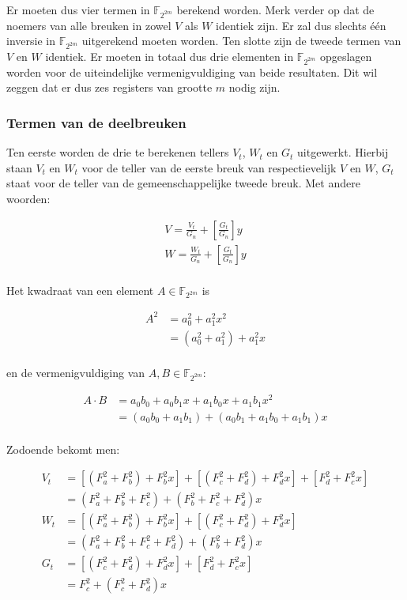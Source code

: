 Er moeten dus vier termen in $\mathbb{F}_{2^{2m}}$ berekend worden. Merk verder op dat de noemers van alle breuken in zowel $V$ als $W$ identiek zijn. Er zal dus slechts \'e\'en inversie in $\mathbb{F}_{2^{2m}}$ uitgerekend moeten worden. Ten slotte zijn de tweede termen van $V$ en $W$ identiek. Er moeten in totaal dus drie elementen in $\mathbb{F}_{2^{2m}}$ opgeslagen worden voor de uiteindelijke vermenigvuldiging van beide resultaten. Dit wil zeggen dat er dus zes registers van grootte $m$ nodig zijn.

\subsubsection{Termen van de deelbreuken}

Ten eerste worden de drie te berekenen tellers $V_t$, $W_t$ en $G_t$ uitgewerkt. Hierbij staan $V_t$ en $W_t$ voor de teller van de eerste breuk van respectievelijk $V$ en $W$, $G_t$ staat voor de teller van de gemeenschappelijke tweede breuk. Met andere woorden:

\[\begin{aligned}
V = \frac{V_t}{G_n} + \left[ \frac{G_t}{G_n} \right] y\\
W = \frac{W_t}{G_n} + \left[ \frac{G_t}{G_n} \right] y\\
\end{aligned}\]

Het kwadraat van een element $A \in \mathbb{F}_{2^{2m}}$ is

\[\begin{aligned}
A^2	&= a_0^2 + a_1^2 x^2\\
		&= (a_0^2 + a_1^2) + a_1^2 x\\
\end{aligned}\]

en de vermenigvuldiging van $A, B \in \mathbb{F}_{2^{2m}}$:

\[\begin{aligned}
A \cdot B	&= a_0 b_0 + a_0 b_1 x + a_1 b_0 x + a_1 b_1 x^2\\
				&= (a_0 b_0 + a_1 b_1) + (a_0 b_1 + a_1 b_0 + a_1 b_1)x\\
\end{aligned}\]

Zodoende bekomt men:

\[\begin{aligned}
V_t	&= [(F_a^2 + F_b^2) + F_b^2 x] + [(F_c^2 + F_d^2) + F_d^2x] + [F_d^2 + F_c^2x]\\
		&= (F_a^2 + F_b^2 + F_c^2) + (F_b^2 + F_c^2 + F_d^2)x\\
W_t	&= [(F_a^2 + F_b^2) + F_b^2 x] + [(F_c^2 + F_d^2) + F_d^2x]\\
		&= (F_a^2 + F_b^2 + F_c^2 + F_d^2) + (F_b^2 + F_d^2)x\\
G_t	&= [(F_c^2 + F_d^2) + F_d^2x] + [F_d^2 + F_c^2x]\\
		&= F_c^2 + (F_c^2 + F_d^2)x\\
\end{aligned}\]

